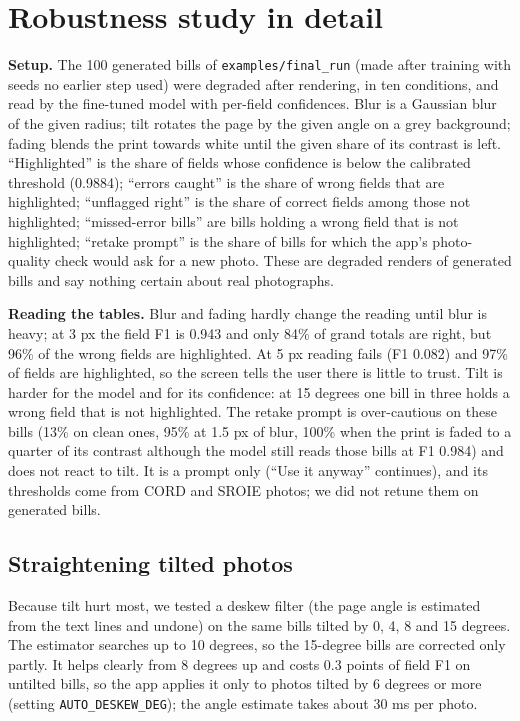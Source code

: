 \newcommand{\tabin}[1]{\begin{center}{\footnotesize\setlength{\tabcolsep}{3pt}}\end{center}}

\section{Robustness study in detail}\label{app:rob}
\textbf{Setup.} The 100 generated bills of \texttt{examples/final\_run} (made after training with seeds no earlier step used) were degraded after rendering, in ten conditions, and read by the fine-tuned model with per-field confidences. Blur is a Gaussian blur of the given radius; tilt rotates the page by the given angle on a grey background; fading blends the print towards white until the given share of its contrast is left. ``Highlighted'' is the share of fields whose confidence is below the calibrated threshold (0.9884); ``errors caught'' is the share of wrong fields that are highlighted; ``unflagged right'' is the share of correct fields among those not highlighted; ``missed-error bills'' are bills holding a wrong field that is not highlighted; ``retake prompt'' is the share of bills for which the app's photo-quality check would ask for a new photo. These are degraded renders of generated bills and say nothing certain about real photographs.

\tabin{data/app_deg_acc.tex}
\tabin{data/app_deg_conf.tex}

\textbf{Reading the tables.} Blur and fading hardly change the reading until blur is heavy; at 3 px the field F1 is 0.943 and only 84\% of grand totals are right, but 96\% of the wrong fields are highlighted. At 5 px reading fails (F1 0.082) and 97\% of fields are highlighted, so the screen tells the user there is little to trust. Tilt is harder for the model and for its confidence: at 15 degrees one bill in three holds a wrong field that is not highlighted. The retake prompt is over-cautious on these bills (13\% on clean ones, 95\% at 1.5 px of blur, 100\% when the print is faded to a quarter of its contrast although the model still reads those bills at F1 0.984) and does not react to tilt. It is a prompt only (``Use it anyway'' continues), and its thresholds come from CORD and SROIE photos; we did not retune them on generated bills.

\subsection*{Straightening tilted photos}
Because tilt hurt most, we tested a deskew filter (the page angle is estimated from the text lines and undone) on the same bills tilted by 0, 4, 8 and 15 degrees. The estimator searches up to 10 degrees, so the 15-degree bills are corrected only partly. It helps clearly from 8 degrees up and costs 0.3 points of field F1 on untilted bills, so the app applies it only to photos tilted by 6 degrees or more (setting \texttt{AUTO\_DESKEW\_DEG}); the angle estimate takes about 30 ms per photo.

